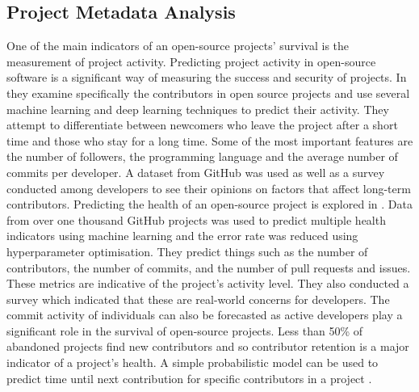\documentclass[conference]{IEEEtran}
\begin{document}
\subsection{Project Metadata Analysis}
One of the main indicators of an open-source projects' survival is the measurement of project activity. Predicting project activity in open-source software is a significant way of measuring the success and security of projects. In \cite{l_bao_large_2021} they examine specifically the contributors in open source projects and use several machine learning and deep learning techniques to predict their activity. They attempt to differentiate between newcomers who leave the project after a short time and those who stay for a long time. Some of the most important features are the number of followers, the programming language and the average number of commits per developer. A dataset from GitHub was used as well as a survey conducted among developers to see their opinions on factors that affect long-term contributors. Predicting the health of an open-source project is explored in \cite{xia_predicting_2022}. Data from over one thousand GitHub projects was used to predict multiple health indicators using machine learning and the error rate was reduced using hyperparameter optimisation. They predict things such as the number of contributors, the number of commits, and the number of pull requests and issues. These metrics are indicative of the project’s activity level. They also conducted a survey which indicated that these are real-world concerns for developers. The commit activity of individuals can also be forecasted as active developers play a significant role in the survival of open-source projects. Less than 50\% of abandoned projects find new contributors and so contributor retention is a major indicator of a project's health. A simple probabilistic model can be used to predict time until next contribution for specific contributors in a project \cite{decan_gap_2020}.
\end{document}
